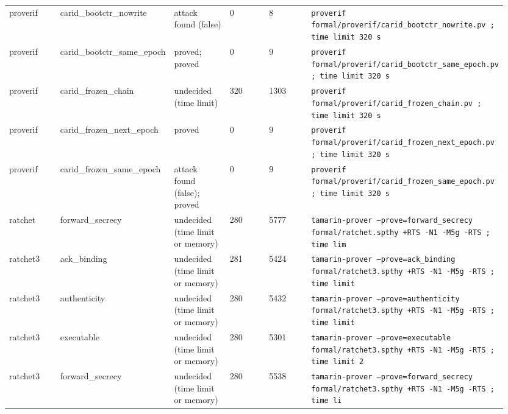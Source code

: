 {\begin{longtable}{p{0.158\linewidth}p{0.158\linewidth}p{0.158\linewidth}p{0.158\linewidth}p{0.158\linewidth}p{0.158\linewidth}}
proverif & carid\_bootctr\_nowrite & attack found (false) & 0 & 8 & \texttt{proverif formal/proverif/carid\_bootctr\_nowrite.pv ; time limit 320 s} \\
proverif & carid\_bootctr\_same\_epoch & proved; proved & 0 & 9 & \texttt{proverif formal/proverif/carid\_bootctr\_same\_epoch.pv ; time limit 320 s} \\
proverif & carid\_frozen\_chain & undecided (time limit) & 320 & 1303 & \texttt{proverif formal/proverif/carid\_frozen\_chain.pv ; time limit 320 s} \\
proverif & carid\_frozen\_next\_epoch & proved & 0 & 9 & \texttt{proverif formal/proverif/carid\_frozen\_next\_epoch.pv ; time limit 320 s} \\
proverif & carid\_frozen\_same\_epoch & attack found (false); proved & 0 & 9 & \texttt{proverif formal/proverif/carid\_frozen\_same\_epoch.pv ; time limit 320 s} \\
ratchet & forward\_secrecy & undecided (time limit or memory) & 280 & 5777 & \texttt{tamarin-prover  --prove=forward\_secrecy formal/ratchet.spthy +RTS -N1 -M5g -RTS ; time lim} \\
ratchet3 & ack\_binding & undecided (time limit or memory) & 281 & 5424 & \texttt{tamarin-prover  --prove=ack\_binding formal/ratchet3.spthy +RTS -N1 -M5g -RTS ; time limit } \\
ratchet3 & authenticity & undecided (time limit or memory) & 280 & 5432 & \texttt{tamarin-prover  --prove=authenticity formal/ratchet3.spthy +RTS -N1 -M5g -RTS ; time limit} \\
ratchet3 & executable & undecided (time limit or memory) & 280 & 5301 & \texttt{tamarin-prover  --prove=executable formal/ratchet3.spthy +RTS -N1 -M5g -RTS ; time limit 2} \\
ratchet3 & forward\_secrecy & undecided (time limit or memory) & 280 & 5538 & \texttt{tamarin-prover  --prove=forward\_secrecy formal/ratchet3.spthy +RTS -N1 -M5g -RTS ; time li} \\
\bottomrule
\end{longtable}}

